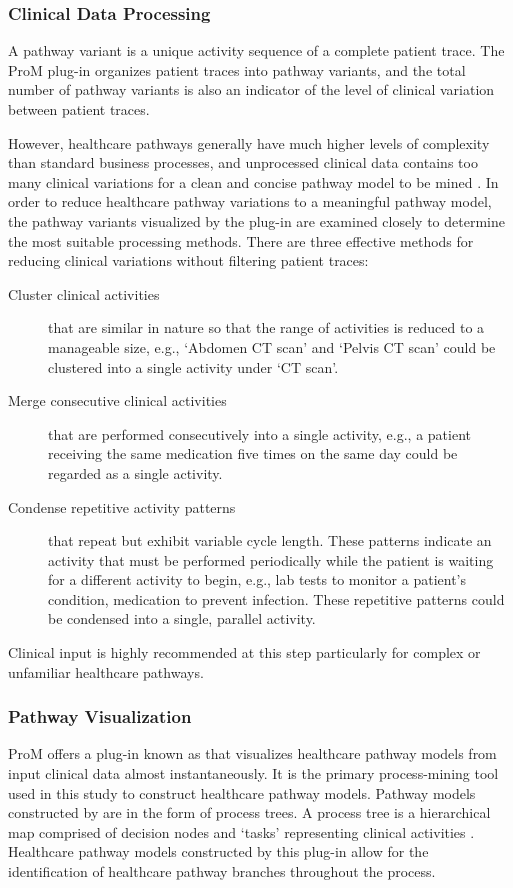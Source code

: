 \subsubsection{Clinical Data Processing}
 A pathway variant is a unique activity sequence of a complete patient trace. The ProM plug-in  organizes patient traces into pathway variants, and the total number of pathway variants is also an indicator of the level of clinical variation between patient traces. 
 
However, healthcare pathways generally have much higher levels of complexity than standard business processes, and unprocessed clinical data contains too many clinical variations for a clean and concise pathway model to be mined \cite{Huang2013, Veiga2010}.
In order to reduce healthcare pathway variations to a meaningful pathway model, the pathway variants visualized by the plug-in  are examined closely to determine the most suitable processing methods. 
There are three effective methods for reducing clinical variations without filtering patient traces:

\begin{description}
    \item[Cluster clinical activities] that are similar in nature so that the range of activities is reduced to a manageable size, e.g., `Abdomen CT scan' and `Pelvis CT scan' could be clustered into a single activity under `CT scan'.
    \item[Merge consecutive clinical activities] that are performed consecutively into a single activity, e.g., a patient receiving the same medication five times on the same day could be regarded as a single activity.
    \item[Condense repetitive activity patterns] 
         that repeat but exhibit variable cycle length. These patterns indicate an activity that must be performed periodically while the patient is waiting for a different activity to begin, e.g., lab tests to monitor a patient’s condition, medication to prevent infection. These repetitive patterns could be condensed into a single, parallel activity.
\end{description}
Clinical input is highly recommended at this step particularly for complex or unfamiliar healthcare pathways. 

\subsubsection{Pathway Visualization}
ProM offers a plug-in known as  that visualizes healthcare pathway models from input clinical data almost instantaneously. It is the primary process-mining tool used in this study to construct healthcare pathway models. Pathway models constructed by  are in the form of process trees. A process tree is a hierarchical map comprised of decision nodes and `tasks' representing clinical activities \cite{25a7fd818bf44606a903d9b78b95cdd3}. Healthcare pathway models constructed by this plug-in allow for the identification of healthcare pathway branches throughout the process.

